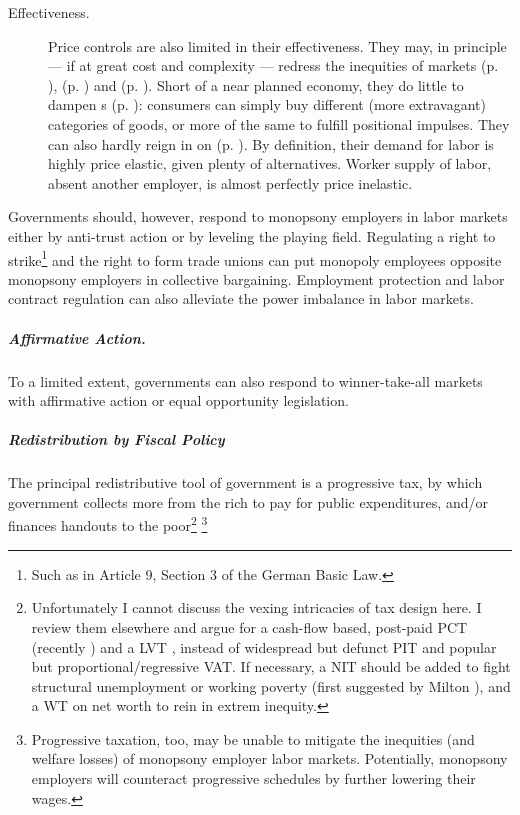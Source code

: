 \begin{description}
	\item[Effectiveness.] 
		Price controls are also limited in their effectiveness. They may, in principle --- if at great cost and complexity --- redress the inequities of  markets (p. \pageref{sec:winne-take-all}),  (p. \pageref{sec:different_budget_constraints}) and  (p. \pageref{sec:diminishing_marginal_utility}). Short of a near planned economy, they do little to dampen s (p. \pageref{sec:positional_race}):  consumers can simply buy different (more extravagant) categories of goods, or more of the same to fulfill positional impulses. They can also hardly reign in on  (p. \pageref{sec:monopsony_employers}). By definition, their demand for labor is highly price elastic, given plenty of alternatives. Worker supply of labor, absent another employer, is almost perfectly price inelastic. 
\end{description}

Governments should, however, respond to monopsony employers in labor markets either by anti-trust action or by leveling the playing field. Regulating a right to strike\footnote{Such as in Article 9, Section 3 of the German Basic Law.} and the right to form trade unions can put monopoly employees opposite monopsony employers in collective bargaining. Employment protection and labor contract regulation can also alleviate the power imbalance in labor markets.

\subparagraph{Affirmative Action.}  \label{sec:affirmative_action} To a limited extent, governments can also respond to winner-take-all markets with affirmative action or equal opportunity legislation.

\subparagraph{Redistribution by Fiscal Policy}  \label{sec:fiscal_redistribution} The principal redistributive tool of government is a progressive tax, by which government collects more from the rich to pay for public expenditures, and/or finances handouts to the poor\footnote{
	Unfortunately I cannot discuss the vexing intricacies of tax design here. I review them elsewhere \citep{Held2010a} and argue for a cash-flow based, post-paid \gls{PCT} (recently \citealt{McCaffery2002,McCaffery2005}) and a \gls{LVT} \citep{George1879}, instead of widespread but defunct \gls{PIT} and popular but proportional/regressive \gls{VAT}. If necessary, a \gls{NIT} should be added to fight structural unemployment or working poverty (first suggested by Milton \citealt{Friedman1962}), and a \gls{WT} on net worth to rein in extrem inequity.}
	\footnote{
	Progressive taxation, too, may be unable to mitigate the inequities (and welfare losses) of monopsony employer labor markets. Potentially, monopsony employers will counteract progressive schedules by further lowering their wages.} 

